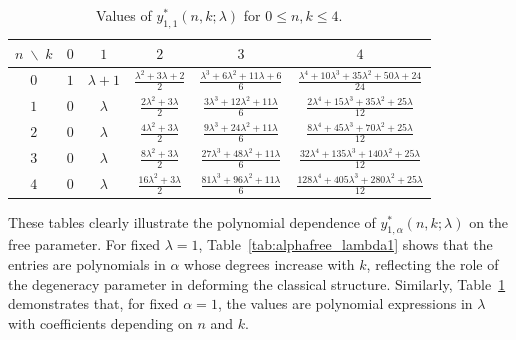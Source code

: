 \documentclass{amsart}
\numberwithin{equation}{section}
\theoremstyle{definition}
\theoremstyle{remark}
\begin{document}
\FloatBarrier
\begin{table}[htbp]
\centering
\setlength{\tabcolsep}{11pt} %
\renewcommand{\arraystretch}{1.7} %
\begin{tabular}{|c|ccccc|}
\hline
$n \;\backslash\; k$ & $0$ & $1$ & $2$ & $3$ & $4$ \\
\hline
$0$ &
$1$ &
$\lambda + 1$ &
$\frac{\lambda^{2} + 3\lambda + 2}{2}$ &
$\frac{\lambda^{3} + 6\lambda^{2} + 11\lambda + 6}{6}$ &
$\frac{\lambda^{4} + 10\lambda^{3} + 35\lambda^{2} + 50\lambda + 24}{24}$ \\

$1$ &
$0$ &
$\lambda$ &
$\frac{2\lambda^{2} + 3\lambda}{2}$ &
$\frac{3\lambda^{3} + 12\lambda^{2} + 11\lambda}{6}$ &
$\frac{2\lambda^{4} + 15\lambda^{3} + 35\lambda^{2} + 25\lambda}{12}$ \\

$2$ &
$0$ &
$\lambda$ &
$\frac{4\lambda^{2} + 3\lambda}{2}$ &
$\frac{9\lambda^{3} + 24\lambda^{2} + 11\lambda}{6}$ &
$\frac{8\lambda^{4} + 45\lambda^{3} + 70\lambda^{2} + 25\lambda}{12}$ \\

$3$ &
$0$ &
$\lambda$ &
$\frac{8\lambda^{2} + 3\lambda}{2}$ &
$\frac{27\lambda^{3} + 48\lambda^{2} + 11\lambda}{6}$ &
$\frac{32\lambda^{4} + 135\lambda^{3} + 140\lambda^{2} + 25\lambda}{12}$ \\

$4$ &
$0$ &
$\lambda$ &
$\frac{16\lambda^{2} + 3\lambda}{2}$ &
$\frac{81\lambda^{3} + 96\lambda^{2} + 11\lambda}{6}$ &
$\frac{128\lambda^{4} + 405\lambda^{3} + 280\lambda^{2} + 25\lambda}{12}$ \\
\hline
\end{tabular}
\caption{Values of $y_{1,1}^{*}(n,k;\lambda)$ for $0\leq n, k\leq 4$.}
\label{tab:alpha1_lambdafree}
\end{table}
\FloatBarrier
\medskip

These tables clearly illustrate the polynomial dependence of
$y_{1,\alpha}^{*}(n,k;\lambda)$ on the free parameter.
For fixed $\lambda=1$, Table~\ref{tab:alphafree_lambda1} shows that the entries
are polynomials in $\alpha$ whose degrees increase with $k$, reflecting the
role of the degeneracy parameter in deforming the classical structure.
Similarly, Table~\ref{tab:alpha1_lambdafree} demonstrates that, for fixed
$\alpha=1$, the values are polynomial expressions in $\lambda$ with coefficients
depending on $n$ and $k$.

\medskip
\end{document}
